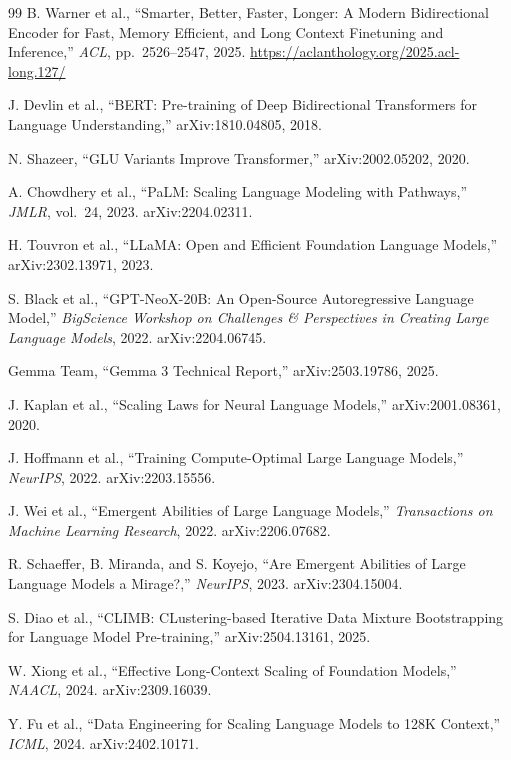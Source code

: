 \documentclass[11pt]{article}
\begin{document}
\begin{thebibliography}{99}
B. Warner et al., ``Smarter, Better, Faster, Longer: A Modern Bidirectional Encoder for Fast, Memory Efficient, and Long Context Finetuning and Inference,'' \textit{ACL}, pp.~2526--2547, 2025. \url{https://aclanthology.org/2025.acl-long.127/}

J. Devlin et al., ``BERT: Pre-training of Deep Bidirectional Transformers for Language Understanding,'' arXiv:1810.04805, 2018.

N. Shazeer, ``GLU Variants Improve Transformer,'' arXiv:2002.05202, 2020.

A. Chowdhery et al., ``PaLM: Scaling Language Modeling with Pathways,'' \textit{JMLR}, vol.~24, 2023. arXiv:2204.02311.

H. Touvron et al., ``LLaMA: Open and Efficient Foundation Language Models,'' arXiv:2302.13971, 2023.

S. Black et al., ``GPT-NeoX-20B: An Open-Source Autoregressive Language Model,'' \textit{BigScience Workshop on Challenges \& Perspectives in Creating Large Language Models}, 2022. arXiv:2204.06745.

Gemma Team, ``Gemma 3 Technical Report,'' arXiv:2503.19786, 2025.

J. Kaplan et al., ``Scaling Laws for Neural Language Models,'' arXiv:2001.08361, 2020.

J. Hoffmann et al., ``Training Compute-Optimal Large Language Models,'' \textit{NeurIPS}, 2022. arXiv:2203.15556.

J. Wei et al., ``Emergent Abilities of Large Language Models,'' \textit{Transactions on Machine Learning Research}, 2022. arXiv:2206.07682.

R. Schaeffer, B. Miranda, and S. Koyejo, ``Are Emergent Abilities of Large Language Models a Mirage?,'' \textit{NeurIPS}, 2023. arXiv:2304.15004.

S. Diao et al., ``CLIMB: CLustering-based Iterative Data Mixture Bootstrapping for Language Model Pre-training,'' arXiv:2504.13161, 2025.

W. Xiong et al., ``Effective Long-Context Scaling of Foundation Models,'' \textit{NAACL}, 2024. arXiv:2309.16039.

Y. Fu et al., ``Data Engineering for Scaling Language Models to 128K Context,'' \textit{ICML}, 2024. arXiv:2402.10171.


\end{thebibliography}
\end{document}
